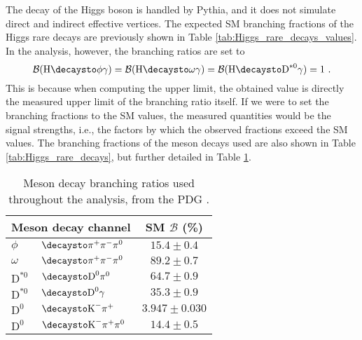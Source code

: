 The decay of the Higgs boson is handled by Pythia, and it does not simulate direct and indirect effective vertices. The expected SM branching fractions of the Higgs rare decays are previously shown in Table \ref{tab:Higgs_rare_decays_values}. %
In the analysis, however, the branching ratios are set to
\begin{equation*}
    \mathcal{B}(\text{H}\decaysto \phi\gamma) = \mathcal{B}(\text{H}\decaysto \omega\gamma) = \mathcal{B}(\text{H}\decaysto \text{D}^{*0}\gamma) = 1\ .
\end{equation*}
This is because when computing the upper limit, the obtained value is directly the measured upper limit of the branching ratio itself. If we were to set the branching fractions to the SM values, the measured quantities would be the signal strengths, i.e., the factors by which the observed fractions exceed the SM values. The branching fractions of the meson decays used are also shown in Table \ref{tab:Higgs_rare_decays}, but further detailed in Table \ref{tab:Meson_decay_br}.

\begin{table}[!ht]
    \centering
    \begin{tabular}{|l@{}l|c|}
        \hline
        \multicolumn{2}{|c|}{\cellcolor{lightgray}Meson decay channel} & \multicolumn{1}{c|}{\cellcolor{lightgray} SM $\mathcal{B}$ (\%)} \\ \hline
        $\phi$&$\decaysto \pi^+\pi^-\pi^0$     & $15.4 \pm 0.4$   \\
        $\omega$&$\decaysto \pi^+\pi^-\pi^0$   & $89.2 \pm 0.7$   \\
        $\text{D}^{*0}$&$\decaysto \text{D}^{0}\pi^0$        & $64.7 \pm 0.9$   \\
        $\text{D}^{*0}$&$\decaysto \text{D}^{0}\gamma$       & $35.3 \pm 0.9$   \\
        $\text{D}^{0}$&$\decaysto \text{K}^{-}\pi^{+}$           & $3.947 \pm 0.030$   \\
        $\text{D}^{0}$&$\decaysto \text{K}^{-}\pi^{+}\pi^0$      & $14.4 \pm 0.5$   \\
        \hline
    \end{tabular}
    \caption{Meson decay branching ratios used throughout the analysis, from the PDG \cite{PDG}.}
    \label{tab:Meson_decay_br}
\end{table}

